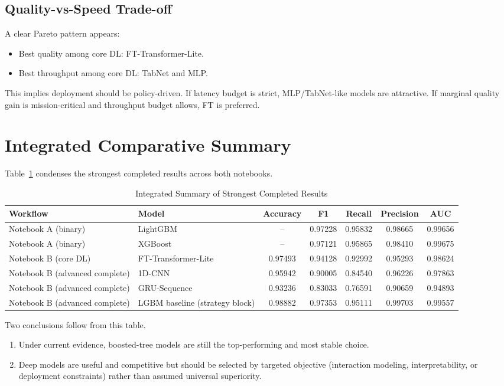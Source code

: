 \documentclass[10pt,journal]{IEEEtran}
\begin{document}
\subsection{Quality-vs-Speed Trade-off}
A clear Pareto pattern appears:
\begin{itemize}
\item Best quality among core DL: FT-Transformer-Lite.
\item Best throughput among core DL: TabNet and MLP.
\end{itemize}

This implies deployment should be policy-driven. If latency budget is strict, MLP/TabNet-like models are attractive. If marginal quality gain is mission-critical and throughput budget allows, FT is preferred.

\section{Integrated Comparative Summary}
Table~\ref{tab:integrated_summary} condenses the strongest completed results across both notebooks.

\begin{table}[!t]
\caption{Integrated Summary of Strongest Completed Results}
\label{tab:integrated_summary}
\centering
\begin{tabular}{l l c c c c c}
\toprule
Workflow & Model & Accuracy & F1 & Recall & Precision & AUC \\
\midrule
Notebook A (binary) & LightGBM & -- & 0.97228 & 0.95832 & 0.98665 & 0.99656 \\
Notebook A (binary) & XGBoost & -- & 0.97121 & 0.95865 & 0.98410 & 0.99675 \\
Notebook B (core DL) & FT-Transformer-Lite & 0.97493 & 0.94128 & 0.92992 & 0.95293 & 0.98624 \\
Notebook B (advanced complete) & 1D-CNN & 0.95942 & 0.90005 & 0.84540 & 0.96226 & 0.97863 \\
Notebook B (advanced complete) & GRU-Sequence & 0.93236 & 0.83033 & 0.76591 & 0.90659 & 0.94893 \\
Notebook B (advanced complete) & LGBM baseline (strategy block) & 0.98882 & 0.97353 & 0.95111 & 0.99703 & 0.99557 \\
\bottomrule
\end{tabular}
\end{table}

Two conclusions follow from this table.

\begin{enumerate}
\item Under current evidence, boosted-tree models are still the top-performing and most stable choice.
\item Deep models are useful and competitive but should be selected by targeted objective (interaction modeling, interpretability, or deployment constraints) rather than assumed universal superiority.
\end{enumerate}
\end{document}

